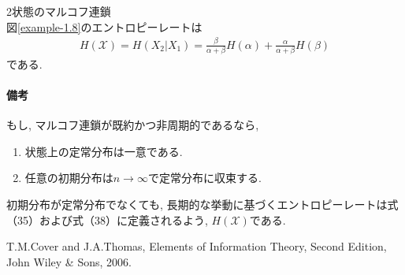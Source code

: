 \documentclass[a4j]{jsarticle}
\begin{document}
 2状態のマルコフ連鎖\\

図\ref{example-1.8}のエントロピーレートは
\begin{align}
	H(\mathcal{X}) = H(X_2|X_1) = \frac{\beta}{\alpha + \beta}H(\alpha) + \frac{\alpha}{\alpha + \beta}H(\beta)
\end{align}
である.\\

\paragraph{備考}

もし, マルコフ連鎖が既約かつ非周期的であるなら,
\begin{enumerate}
	\item 状態上の定常分布は一意である.
	\item 任意の初期分布は$n \rightarrow \infty$で定常分布に収束する.
\end{enumerate}
初期分布が定常分布でなくても, 長期的な挙動に基づくエントロピーレートは式（35）および式（38）に定義されるよう, $H(\mathcal{X})$である.




\begin{thebibliography}{99}
	T.M.Cover and J.A.Thomas, Elements of Information Theory, Second Edition, John Wiley \& Sons, 2006.
\end{thebibliography}
\end{document}
